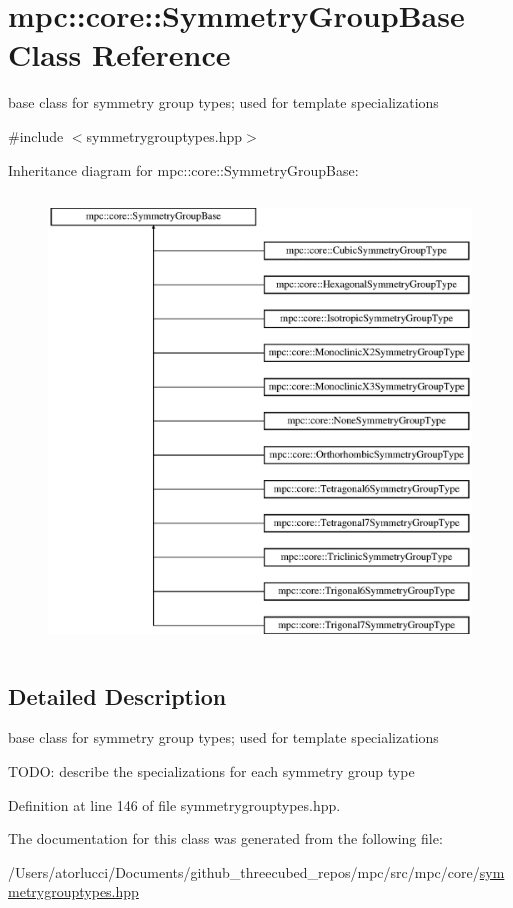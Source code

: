 \hypertarget{structmpc_1_1core_1_1_symmetry_group_base}{}\section{mpc\+:\+:core\+:\+:Symmetry\+Group\+Base Class Reference}
\label{structmpc_1_1core_1_1_symmetry_group_base}


base class for symmetry group types; used for template specializations  




{\ttfamily \#include $<$symmetrygrouptypes.\+hpp$>$}

Inheritance diagram for mpc\+:\+:core\+:\+:Symmetry\+Group\+Base\+:\begin{figure}[H]
\begin{center}
\leavevmode
\includegraphics[height=12.000000cm]{structmpc_1_1core_1_1_symmetry_group_base}
\end{center}
\end{figure}


\subsection{Detailed Description}
base class for symmetry group types; used for template specializations 

T\+O\+DO\+: describe the specializations for each symmetry group type 

Definition at line 146 of file symmetrygrouptypes.\+hpp.



The documentation for this class was generated from the following file\+:\begin{DoxyCompactItemize}
\item 
/\+Users/atorlucci/\+Documents/github\+\_\+threecubed\+\_\+repos/mpc/src/mpc/core/\mbox{\hyperlink{symmetrygrouptypes_8hpp}{symmetrygrouptypes.\+hpp}}\end{DoxyCompactItemize}
